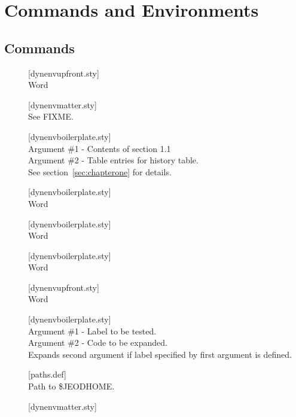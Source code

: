 \section{Commands and Environments}
\subsection{Commands}
\begin{description}
\item[]
  \hfill [dynenvupfront.sty] \\
  Word
\item[]
  \hfill [dynenvmatter.sty] \\
  See FIXME.
\item[]
  \hfill [dynenvboilerplate.sty] \\
  Argument \#1 - Contents of section 1.1 \\
  Argument \#2 - Table entries for history table. \\
  See section~\ref{sec:chapterone} for details.
\item[] \hfill [dynenvboilerplate.sty] \\
  Word
\item[] \hfill [dynenvboilerplate.sty] \\
  Word
\item[] \hfill [dynenvboilerplate.sty] \\
  Word
\item[]
  \hfill [dynenvupfront.sty] \\
  Word
\item[]
  \hfill [dynenvboilerplate.sty] \\
  Argument \#1 - Label to be tested.\\
  Argument \#2 - Code to be expanded. \\
  Expands second argument if label specified by first argument is defined.
\item[] \hfill [paths.def] \\
  Path to \$JEODHOME.
\item[]
  \hfill [dynenvmatter.sty] \\

\end{description}
